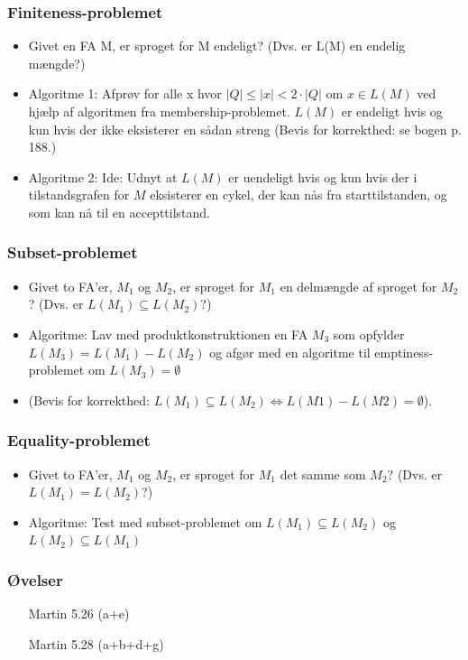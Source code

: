 \documentclass{beamer}
\begin{document}
\begin{frame}
  \frametitle{Finiteness-problemet}
  \begin{itemize}[<+->]
  \item Givet en FA M, er sproget for M endeligt?  
    (Dvs. er L(M) en endelig mængde?) 
  \item
    Algoritme 1: 
    Afprøv for alle x hvor $|Q| \leq |x| < 2\cdot |Q|$ om $x\in L(M)$ ved  
    hjælp af algoritmen fra membership-problemet.
    $L(M)$ er endeligt hvis og kun hvis der ikke eksisterer en  
    sådan streng 
    (Bevis for korrekthed: se bogen p. 188.)
  \item 
    Algoritme 2: Ide: Udnyt at $L(M)$ er uendeligt hvis og kun hvis der i
    tilstandsgrafen for $M$ eksisterer en cykel, der kan nås fra
    starttilstanden, og som kan nå til en accepttilstand.
  \end{itemize}
\end{frame}

\begin{frame}
\frametitle{Subset-problemet}
\begin{itemize}[<+->]
\item Givet to FA’er, $M_1$ og $M_2$, er sproget for $M_1$ en delmængde  
af sproget for $M_2$? (Dvs. er $L(M_1)\subseteq L(M_2)$?) 
\item Algoritme: 
Lav med produktkonstruktionen en FA $M_3$ som opfylder  
$L(M_3) = L(M_1) - L(M_2)$ og afgør med en algoritme til  
emptiness-problemet om $L(M_3)=\emptyset$ 
\item (Bevis for korrekthed:  $L(M_1)\subseteq L(M_2)  \Leftrightarrow  L(M1) - L(M2) = \emptyset$).
\end{itemize}
\end{frame}

\begin{frame}
\frametitle{Equality-problemet}
\begin{itemize}[<+->]
\item Givet to FA’er, $M_1$ og $M_2$, er sproget for $M_1$ det samme som $M_2$? (Dvs. er $L(M_1)=L(M_2)$?) 
\item Algoritme:
  Test med subset-problemet om $L(M_1) \subseteq L(M_2)$ og $L(M_2) \subseteq L(M_1)$
\end{itemize}
\end{frame}

\begin{frame}
\frametitle{Øvelser}
\begin{itemize}[<+->]
\item  [Martin] 5.26 (a+e) 
\item  [Martin] 5.28 (a+b+d+g)
\end{itemize}
\end{frame}
\end{document}

